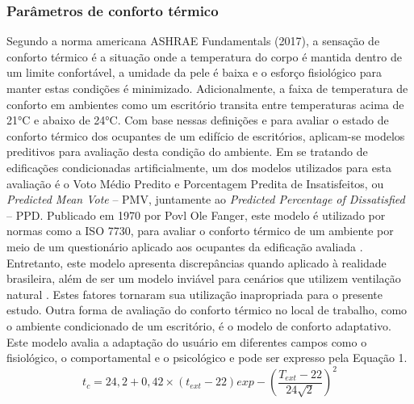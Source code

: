 \subsubsection{Parâmetros de conforto térmico}
Segundo a norma americana ASHRAE Fundamentals (2017), a sensação de conforto térmico 
é a situação onde a temperatura do corpo é mantida dentro de um limite confortável, 
a umidade da pele é baixa e o esforço fisiológico para manter estas condições é minimizado. 
Adicionalmente, a faixa de temperatura de conforto em ambientes como um escritório 
transita entre temperaturas acima de 21°C e abaixo de 24°C. Com base nessas definições 
e para avaliar o estado de conforto térmico dos ocupantes de um edifício de escritórios, 
aplicam-se modelos preditivos para avaliação desta condição do ambiente.\vspace*{0.3cm} \newline
Em se tratando de edificações condicionadas artificialmente, um dos modelos utilizados 
para esta avaliação é o Voto Médio Predito e Porcentagem Predita de Insatisfeitos, 
ou \textit{Predicted Mean Vote} – PMV, juntamente ao \textit{Predicted Percentage of Dissatisfied} – PPD.\vspace*{0.3cm} \newline
Publicado em 1970 por Povl Ole Fanger, este modelo é utilizado por normas como 
a ISO 7730, para avaliar o conforto térmico de um ambiente por meio de um questionário 
aplicado aos ocupantes da edificação avaliada \cite{AmericanSocietyofHeatingRefrigeratingandAir-ConditioningEngineers-ASHRAE2017}. Entretanto, este 
modelo apresenta discrepâncias quando aplicado à realidade brasileira, além de ser um 
modelo inviável para cenários que utilizem ventilação natural \cite{Rupp2016}. 
Estes fatores tornaram sua utilização inapropriada para o presente estudo.
Outra forma de avaliação do conforto térmico no local de trabalho, como o ambiente 
condicionado de um escritório, é o modelo de conforto adaptativo. Este modelo avalia a 
adaptação do usuário em diferentes campos como o fisiológico, o comportamental e o 
psicológico \cite{AmericanSocietyofHeatingRefrigeratingandAir-ConditioningEngineers-ASHRAE2017a} e pode ser expresso pela Equação 1.
\begin{equation}\label{eq:eq1}
            t_{c}=24,2+0,42\times(t_{ext}-22)exp-\left(\frac{T_{ext}-22}{24\sqrt{2}}\right)^2
\end{equation}

